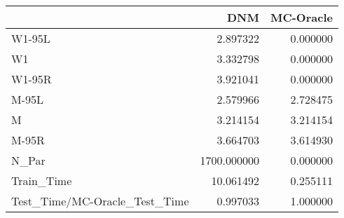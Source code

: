 \begin{tabular}{lrr}
\toprule
{} &          DNM &  MC-Oracle \\
\midrule
W1-95L                        &     2.897322 &   0.000000 \\
W1                            &     3.332798 &   0.000000 \\
W1-95R                        &     3.921041 &   0.000000 \\
M-95L                         &     2.579966 &   2.728475 \\
M                             &     3.214154 &   3.214154 \\
M-95R                         &     3.664703 &   3.614930 \\
N\_Par                         &  1700.000000 &   0.000000 \\
Train\_Time                    &    10.061492 &   0.255111 \\
Test\_Time/MC-Oracle\_Test\_Time &     0.997033 &   1.000000 \\
\bottomrule
\end{tabular}
